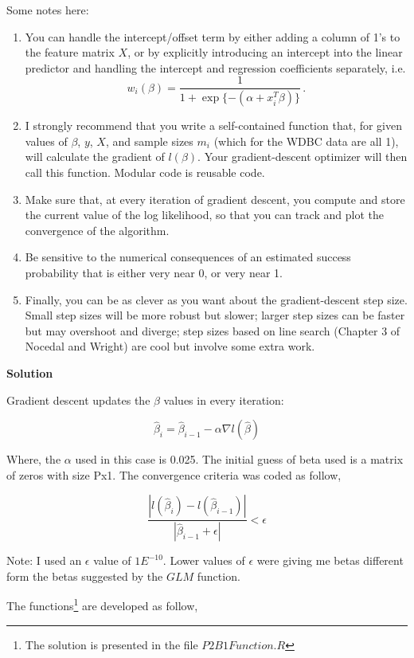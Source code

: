 \documentclass[11 pt]{article}
\begin{document}
\begin{enumerate}[label=(\Alph*)]
Some notes here:
\begin{enumerate}[label=\arabic*.]
\item You can handle the intercept/offset term by either adding a column of 1's to the feature matrix $X$, or by explicitly introducing an intercept into the linear predictor and handling the intercept and regression coefficients separately, i.e.
$$
w_i(\beta) =  \frac{1}{1 + \exp\{-(\alpha + x_i^T \beta )\}} \, .
$$
\item I strongly recommend that you write a self-contained function that, for given values of $\beta$, $y$, $X$, and sample sizes $m_i$ (which for the WDBC data are all 1), will calculate the gradient of $l(\beta)$.  Your gradient-descent optimizer will then call this function.  Modular code is reusable code.
\item Make sure that, at every iteration of gradient descent, you compute and store the current value of the log likelihood, so that you can track and plot the convergence of the algorithm.
\item Be sensitive to the numerical consequences of an estimated success probability that is either very near 0, or very near 1.
\item Finally, you can be as clever as you want about the gradient-descent step size.  Small step sizes will be more robust but slower; larger step sizes can be faster but may overshoot and diverge; step sizes based on line search (Chapter 3 of Nocedal and Wright) are cool but involve some extra work.
\end{enumerate}

\vspace{2mm}
\textbf{Solution}


Gradient descent updates the $\beta$ values in every iteration:

$$ \hat\beta_{i} = \hat\beta_{i-1} - \alpha \nabla l(\hat\beta) $$

Where, the $\alpha$ used in this case is 0.025. The initial guess of beta used is a matrix of zeros with size Px1. 
The convergence criteria was coded as follow,

$$ \frac{|l(\hat\beta_i) - l(\hat\beta_{i-1})|}{|\hat\beta_{i-1} + \epsilon|} < \epsilon$$

Note: I used an $\epsilon$ value of $1E^{-10}$. Lower values of $\epsilon$ were giving me betas different form the betas suggested by the $GLM$ function. 

The functions\footnote{The solution is presented in the file $P2B1Function.R$} are developed as follow, 
\newpage


\end{enumerate}
\end{document}
